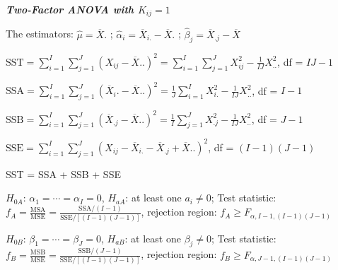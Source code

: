 \documentclass{article}
\newcommand{\smalltitle}[1]{
	\noindent
	\textbf{\textit{#1}}
}
\begin{document}
	\smalltitle{Two-Factor ANOVA with $\mathbf{\mathit{K_{ij}=1}}$}
	
	
	The estimators: $\hat { \mu } = \overline { X } . $ ; $ \hat { \alpha } _ { i } = \overline { X } _ { i . } - \overline { X } . $ ; $ \hat { \beta } _ { j } = \overline { X } _ { . j } - \overline { X }$
	
	{\small
		
		\noindent
		$\mathrm { SST } = \sum _ { i = 1 } ^ { I } \sum _ { j = 1 } ^ { J } \left( X _ { i j } - \overline { X } . . \right) ^ { 2 } = \sum _ { i = 1 } ^ { I } \sum _ { j = 1 } ^ { J } X _ { i j } ^ { 2 } - \frac { 1 } { I J } X ^ { 2 } _{ . .}$, df = $IJ-1$
		
		\noindent
		$\mathrm { SSA } = \sum _ { i = 1 } ^ { I } \sum _ { j = 1 } ^ { J } \left( \overline { X } _ { i } . - \overline { X } . . \right) ^ { 2 } = \frac { 1 } { J } \sum _ { i = 1 } ^ { I } X _ { i. } ^ { 2 } - \frac { 1 } { I J } X ^ { 2 }_{..}$, df = $I-1$
		
		\noindent
		$\mathrm { SSB } = \sum _ { i = 1 } ^ { I } \sum _ { j = 1 } ^ { J } \left( \overline { X } _ { . j } - \overline { X } . . \right) ^ { 2 } = \frac { 1 } { I } \sum _ { j = 1 } ^ { J } X _ { . j } ^ { 2 } - \frac { 1 } { I J } X _ { . . } ^ { 2 }$, df = $J-1$
		
		\noindent
		$\mathrm { SSE } = \sum _ { i = 1 } ^ { I } \sum _ { j = 1 } ^ { J } \left( X _ { i j } - \overline { X } _ { i .}  - \overline { X } _ { . j } + \overline { X } . . \right) ^ { 2 }$, df = $(I-1)(J-1)$
		
	}
	
	SST = SSA + SSB + SSE
	
	
	$H_{0A}$: $\alpha_1 = \cdots = \alpha_I = 0$, $H_{aA}$: at least one $a_i \neq 0$; Test statistic: $f_A = \frac{\mathrm{MSA}}{\mathrm{ MSE }} = \frac{\mathrm{ SSA }/(I-1)}{\mathrm{ SSE }/\left[(I-1)(J-1)\right]}$, rejection region: $f _ { A } \geq F _ { \alpha , I - 1 , ( I - 1 ) ( J - 1 ) }$
	
	$H_{0B}$: $\beta_1 = \cdots = \beta_J = 0$, $H_{aB}$: at least one $\beta_j \neq 0$; Test statistic: $f_B = \frac{\mathrm{MSB}}{\mathrm{ MSE }} = \frac{\mathrm{ SSB }/(J-1)}{\mathrm{ SSE }/\left[(I-1)(J-1)\right]}$, rejection region: $f _ { B } \geq F _ { \alpha , J - 1 , ( I - 1 ) ( J - 1 ) }$
	
\end{document}
